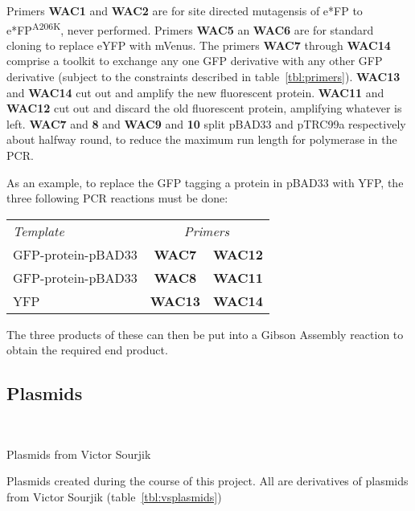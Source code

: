\documentclass[../main.tex]{subfiles}
\begin{document}
Primers \textbf{WAC1} and \textbf{WAC2} are for site directed mutagensis of e*FP to e*FP\textsuperscript{A206K}, never performed. Primers \textbf{WAC5} an \textbf{WAC6} are for standard cloning to replace eYFP with mVenus. The primers \textbf{WAC7} through \textbf{WAC14} comprise a toolkit to exchange any one GFP derivative with any other GFP derivative (subject to the constraints described in table~\ref{tbl:primers}). \textbf{WAC13} and \textbf{WAC14} cut out and amplify the new fluorescent protein. \textbf{WAC11} and \textbf{WAC12} cut out and discard the old fluorescent protein, amplifying whatever is left. \textbf{WAC7} and \textbf{8} and \textbf{WAC9} and \textbf{10} split pBAD33 and pTRC99a respectively about halfway round, to reduce the maximum run length for polymerase in the PCR.

As an example, to replace the GFP tagging a protein in pBAD33 with YFP, the three following PCR reactions must be done:
\begin{center}
\begin{tabular}{lcc}
\textit{Template}&\multicolumn{2}{c}{\textit{Primers}} \\
GFP-protein-pBAD33	&	\textbf{WAC7} 	&	\textbf{WAC12}\\
GFP-protein-pBAD33	&	\textbf{WAC8} 	&	\textbf{WAC11}\\
YFP					&	\textbf{WAC13}	&	\textbf{WAC14}
\end{tabular}
\end{center}


The three products of these can then be put into a Gibson Assembly reaction to obtain the required end product.
\subsection{Plasmids}
\label{sec:plaspri:plas}
~

\begin{table}[h!]
\begin{center}
\caption[Plasmids (Victor Sourjik)]{Plasmids from Victor Sourjik}
\label{tbl:vsplasmids}
\end{center}
\end{table}

\begin{table}[h!]
\begin{center}
\caption[Plasmids]{Plasmids created during the course of this project. All are derivatives of plasmids from Victor Sourjik (table~\ref{tbl:vsplasmids})}
\label{tbl:myplasmids}
\end{center}
\end{table}
\end{document}
